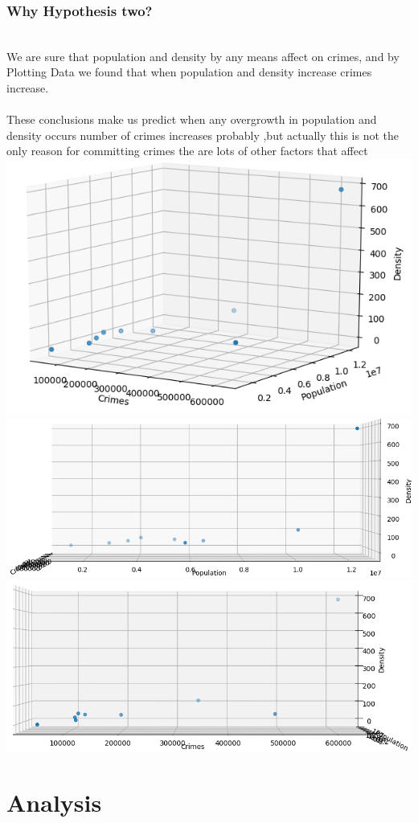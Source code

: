 \documentclass[landscape,17pt]{extarticle}
\begin{document}
        \subsubsection{Why Hypothesis two?}\\
        We are sure that population and density by any means affect on crimes, and by Plotting Data we found that when population and density  increase crimes increase.\\\\
        These conclusions make us predict when any overgrowth in population and density occurs number of crimes increases probably ,but actually this is not the only reason for committing crimes the are lots of other factors that affect\\
        \includegraphics[width=.5\textwidth]{Images/Figure5.png}
        \includegraphics[width=.35\textwidth,height=.4\textheight]{Images/Figure3.png}
        \includegraphics[width=.35\textwidth,height=.4\textheight]{Images/Figure4.png}
    
\section{Analysis}
\end{document}
